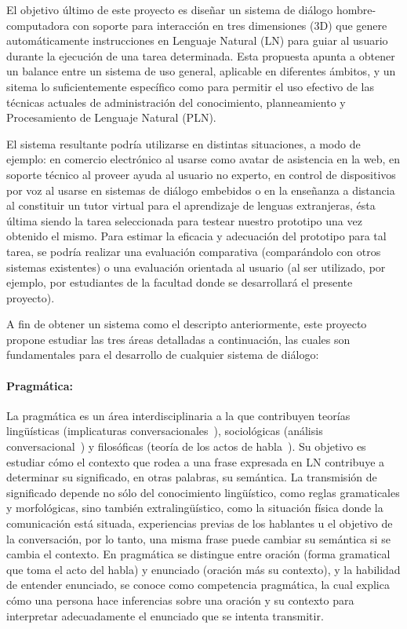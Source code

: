 
El objetivo \'ultimo de este proyecto es dise\~nar un sistema de di\'alogo hombre-computadora con soporte para interacci\'on en tres dimensiones (3D) que genere autom\'aticamente instrucciones en Lenguaje Natural (LN) para guiar  al usuario durante la ejecuci\'on de una tarea determinada. Esta propuesta apunta
a obtener un balance entre un sistema de uso general, aplicable en
diferentes \'ambitos, y un sitema lo suficientemente espec\'ifico
como para permitir el uso efectivo de las t\'ecnicas actuales de
administraci\'on del conocimiento, planneamiento y Procesamiento de Lenguaje Natural (PLN).

El sistema resultante podr\'ia utilizarse en distintas situaciones, a modo de ejemplo:
en comercio electr\'onico  al usarse como avatar de asistencia en la web, en soporte t\'ecnico al proveer ayuda al usuario no experto, en
control de dispositivos por voz al usarse en sistemas de di\'alogo embebidos o
en la ense\~nanza a distancia al constituir un tutor virtual para el aprendizaje de lenguas extranjeras, \'esta \'ultima siendo la tarea seleccionada para testear nuestro prototipo una vez obtenido
el mismo. Para estimar la eficacia y adecuaci\'on del prototipo para tal tarea, se podr\'ia realizar una evaluaci\'on comparativa (compar\'andolo con otros sistemas existentes) o una evaluaci\'on orientada al usuario (al ser utilizado, por ejemplo, por estudiantes de la facultad donde se desarrollar\'a el presente proyecto).


A fin de obtener un sistema como el descripto anteriormente, este proyecto propone estudiar las tres \'areas detalladas a continuaci\'on, las cuales son  fundamentales para el desarrollo de cualquier sistema de di\'alogo:

\paragraph{Pragm\'atica:} La pragm\'atica es un \'area interdisciplinaria a
la que contribuyen teor\'ias ling\"u\'isticas (implicaturas
conversacionales~\citep{Grice75}), sociol\'ogicas (an\'alisis
conversa\-cio\-nal~\citep{schegloff87b}) y filos\'oficas (teor\'ia de los actos
de habla~\citep{austin62}). Su objetivo es estudiar c\'omo el contexto que rodea a una frase expresada en LN
contribuye a determinar su significado, en otras palabras, su sem\'antica. La transmisi\'on de significado depende no s\'olo del
conocimiento ling\"u\'istico, como reglas gramaticales y morfol\'ogicas, sino
tambi\'en extraling\"u\'istico, como la situaci\'on f\'isica donde la comunicaci\'on
est\'a situada, experiencias previas de los hablantes u el objetivo de la
conversaci\'on, por lo tanto, una misma frase puede cambiar su sem\'antica si se cambia el contexto.  En
pragm\'atica se distingue entre oraci\'on (forma
gramatical que toma el acto del habla) y enunciado (oraci\'on m\'as su contexto), y la habilidad de entender enunciado, se conoce como competencia pragm\'atica, la cual explica c\'omo una persona hace
inferencias sobre una oraci\'on y su contexto para interpretar adecuadamente el enunciado que se intenta transmitir.

